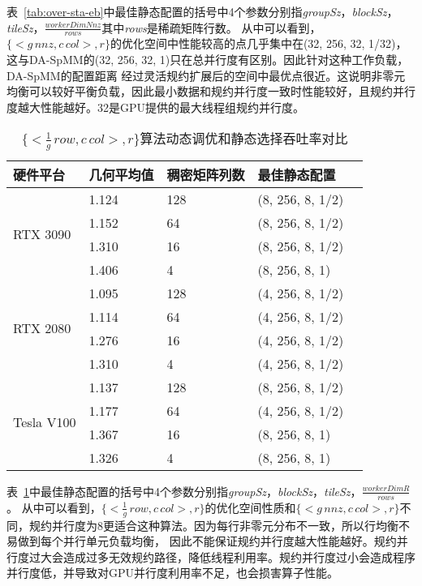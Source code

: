 表~\ref{tab:over-sta-eb}中最佳静态配置的括号中4个参数分别指\textit{groupSz}，\textit{blockSz}，\textit{tileSz}，$\frac{workerDimNnz}{rows}$其中\textit{rows}是稀疏矩阵行数。
从中可以看到，$\{<g\,nnz , c\,col>,r\}$的优化空间中性能较高的点几乎集中在(32, 256, 32, 1/32)，这与DA-SpMM的(32, 256, 32, 1)只在总并行度有区别。因此针对这种工作负载，DA-SpMM的配置距离
经过灵活规约扩展后的空间中最优点很近。这说明非零元均衡可以较好平衡负载，因此最小数据和规约并行度一致时性能较好，且规约并行度越大性能越好。32是GPU提供的最大线程组规约并行度。
\begin{table}
  \centering
  \caption{$\{<\frac{1}{g}\,row , c\,col>,r\}$算法动态调优和静态选择吞吐率对比}
  \begin{tabular}{lllll}
  \toprule
  硬件平台 & 几何平均值  & 稠密矩阵列数 & 最佳静态配置 \\
  \midrule
  \multirow{4}{*}{RTX 3090}& 1.124  & 128 & (8, 256, 8, 1/2)\\
                          & 1.152   & 64 & (8, 256, 8, 1/2)\\
                          & 1.310   & 16 & (8, 256, 8, 1/2)\\
                          & 1.406   & 4 & (8, 256, 8, 1)\\
  \hline
  \multirow{4}{*}{RTX 2080}& 1.095  & 128 & (4, 256, 8, 1/2)\\
                          & 1.114   & 64 & (4, 256, 8, 1/2)\\
                          & 1.276   & 16& (4, 256, 8, 1/2)\\
                          & 1.310   & 4 & (4, 256, 8, 1/2)\\
  \hline
  \multirow{4}{*}{Tesla V100}& 1.137  & 128 & (8, 256, 8, 1/2)\\
                          & 1.177   & 64 & (4, 256, 8, 1/2)\\
                          & 1.367   & 16 & (8, 256, 8, 1)\\
                          & 1.326   & 4 & (8, 256, 8, 1)\\
  \bottomrule
  \end{tabular}
  \label{tab:over-sta-rb}
\end{table}
表~\ref{tab:over-sta-rb}中最佳静态配置的括号中4个参数分别指\textit{groupSz}，\textit{blockSz}，\textit{tileSz}，$\frac{workerDimR}{rows}$。
从中可以看到，$\{<\frac{1}{g}\,row , c\,col>,r\}$的优化空间性质和$\{<g\,nnz , c\,col>,r\}$不同，规约并行度为8更适合这种算法。因为每行非零元分布不一致，所以行均衡不易做到每个并行单元负载均衡，
因此不能保证规约并行度越大性能越好。规约并行度过大会造成过多无效规约路径，降低线程利用率。规约并行度过小会造成程序并行度低，并导致对GPU并行度利用率不足，也会损害算子性能。


